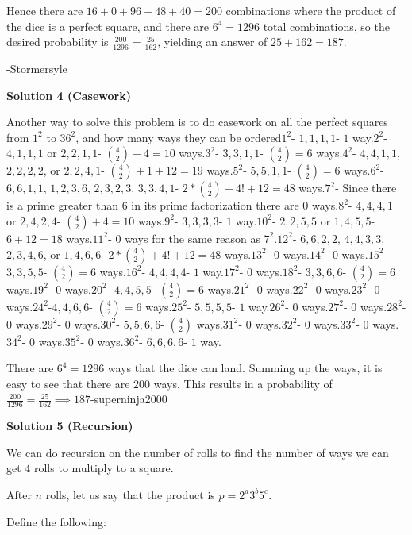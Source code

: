 \begin{enumerate}
 Hence there are $16+0+96+48+40=200$ combinations where the product of the dice is a perfect square, and there are $6^4=1296$ total combinations, so the desired probability is $\frac{200}{1296}=\frac{25}{162}$, yielding an answer of $25+162=\boxed{187}$.

 -Stormersyle

 



\textbf{Solution 4 (Casework)}

Another way to solve this problem is to do casework on all the perfect squares from $1^2$ to $36^2$, and how many ways they can be ordered$1^2$- $1,1,1,1$- $1$ way.$2^2$- $4,1,1,1$ or $2,2,1,1$- $\binom{4}{2}+4=10$ ways.$3^2$- $3,3,1,1$- $\binom{4}{2}=6$ ways.$4^2$- $4,4,1,1$, $2,2,2,2$, or $2,2,4,1$- $\binom{4}{2}+1+12=19$ ways.$5^2$- $5,5,1,1$- $\binom{4}{2}=6$ ways.$6^2$- $6,6,1,1$, $1,2,3,6$, $2,3,2,3$, $3,3,4,1$- $2*\binom{4}{2}+4!+12=48$ ways.$7^2$- Since there is a prime greater than 6 in its prime factorization there are $0$ ways.$8^2$- $4,4,4,1$ or $2,4,2,4$- $\binom{4}{2}+4=10$ ways.$9^2$- $3,3,3,3$- $1$ way.$10^2$- $2,2,5,5$ or $1,4,5,5$- $6+12=18$ ways.$11^2$- $0$ ways for the same reason as $7^2$.$12^2$- $6,6,2,2$, $4,4,3,3$, $2,3,4,6$, or $1,4,6,6$- $2*\binom{4}{2}+4!+12=48$ ways.$13^2$- $0$ ways.$14^2$- $0$ ways.$15^2$- $3,3,5,5$- $\binom{4}{2}=6$ ways.$16^2$- $4,4,4,4$- $1$ way.$17^2$- $0$ ways.$18^2$- $3,3,6,6$- $\binom{4}{2}=6$ ways.$19^2$- $0$ ways.$20^2$- $4,4,5,5$- $\binom{4}{2}=6$ ways.$21^2$- $0$ ways.$22^2$- $0$ ways.$23^2$- $0$ ways.$24^2$-$4,4,6,6$- $\binom{4}{2}=6$ ways.$25^2$- $5,5,5,5$- $1$ way.$26^2$- $0$ ways.$27^2$- $0$ ways.$28^2$- $0$ ways.$29^2$- $0$ ways.$30^2$- $5,5,6,6$- $\binom{4}{2}$ ways.$31^2$- $0$ ways.$32^2$- $0$ ways.$33^2$- $0$ ways.$34^2$- $0$ ways.$35^2$- $0$ ways.$36^2$- $6,6,6,6$- $1$ way.

 There are $6^4=1296$ ways that the dice can land. Summing up the ways, it is easy to see that there are $200$ ways. This results in a probability of $\frac{200}{1296}=\frac{25}{162}\implies\boxed{187}$-superninja2000

 



\textbf{Solution 5 (Recursion)}

We can do recursion on the number of rolls to find the number of ways we can get $4$ rolls to multiply to a square.

 After $n$ rolls, let us say that the product is $p = 2^a3^b5^c$.

 Define the following:


\end{enumerate}

